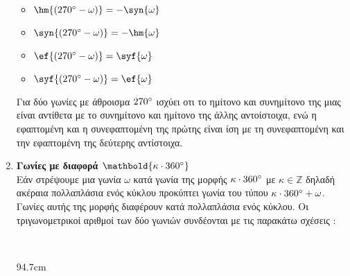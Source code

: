 \documentclass[twoside,nofonts,internet,shmeiwseis]{thewria}
\begin{document}
\begin{enumerate}[itemsep=0mm,label=\bf\arabic*.]
{}{
\begin{multicols}{2}
\begin{itemize}[itemsep=0mm]
\item $ \hm{\left( 270\degree-\omega\right) }=-\syn{\omega} $
\item $ \syn{\left( 270\degree-\omega\right) }=-\hm{\omega} $
\item $ \ef{\left( 270\degree-\omega\right) }=\syf{\omega} $
\item $ \syf{\left( 270\degree-\omega\right) }=\ef{\omega} $
\end{itemize}
\end{multicols}
Για δύο γωνίες με άθροισμα $ 270\degree $ ισχύει οτι το ημίτονο και συνημίτονο της μιας είναι αντίθετα με το συνημίτονο και ημίτονο της άλλης αντοίστοιχα, ενώ η εφαπτομένη και η συνεφαπτομένη της πρώτης είναι ίση με τη συνεφαπτομένη και την εφαπτομένη της δεύτερης αντίστοιχα.}
\item \textbf{Γωνίες με διαφορά $ \mathbold{\kappa\cdot360\degree} $}\\
Εάν στρέψουμε μια γωνία $ \omega $ κατά γωνία της μορφής $ \kappa\cdot360\degree $ με $ \kappa\in\mathbb{Z} $ δηλαδή ακέραια πολλαπλάσια ενός κύκλου προκύπτει γωνία του τύπου $ \kappa\cdot360\degree+\omega $. Γωνίες αυτής της μορφής διαφέρουν κατά πολλαπλάσια ενός κύκλου. Οι τριγωνομετρικοί αριθμοί των δύο γωνιών συνδέονται με τις παρακάτω σχέσεις :\\
\begin{minipage}{\linewidth}\mbox{}\\
\vspace{-1cm}
\begin{WrapText2}{9}{4.7cm}
\newcommand\bigangle[2][]{%
\draw[->,domain=0:#2,variable=\t,samples=200,>=latex,#1]
plot ({(\t+#2)*cos(\t)/(#2*10)},
{(\t+#2)*sin(\t)/(#2*10)})	;}
\begin{tikzpicture}[>=latex,scale=1.5]

\end{tikzpicture}
\end{WrapText2}
\end{minipage}
\end{enumerate}
\end{document}
